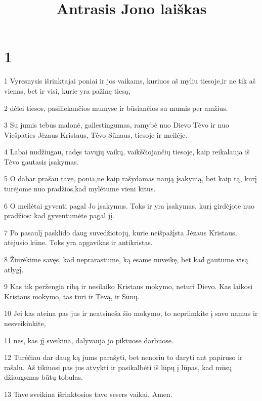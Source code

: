 

\title{Antrasis Jono laiškas}

\chapter{1}


\par 1 Vyresnysis išrinktajai poniai ir jos vaikams, kuriuos aš myliu tiesoje,­ir ne tik aš vienas, bet ir visi, kurie yra pažinę tiesą,­ 
\par 2 dėlei tiesos, pasiliekančios mumyse ir būsiančios su mumis per amžius. 
\par 3 Su jumis tebus malonė, gailestingumas, ramybė nuo Dievo Tėvo ir nuo Viešpaties Jėzaus Kristaus, Tėvo Sūnaus, tiesoje ir meilėje. 
\par 4 Labai nudžiugau, radęs tavųjų vaikų, vaikščiojančių tiesoje, kaip reikalauja iš Tėvo gautasis įsakymas. 
\par 5 O dabar prašau tave, ponia,­ne kaip rašydamas naują įsakymą, bet kaip tą, kurį turėjome nuo pradžios,­kad mylėtume vieni kitus. 
\par 6 O meilė­tai gyventi pagal Jo įsakymus. Toks ir yra įsakymas, kurį girdėjote nuo pradžios: kad gyventumėte pagal jį. 
\par 7 Po pasaulį pasklido daug suvedžiotojų, kurie neišpažįsta Jėzaus Kristaus, atėjusio kūne. Toks yra apgavikas ir antikristas. 
\par 8 Žiūrėkime savęs, kad neprarastume, ką esame nuveikę, bet kad gautume visą atlygį. 
\par 9 Kas tik peržengia ribą ir nesilaiko Kristaus mokymo, neturi Dievo. Kas laikosi Kristaus mokymo, tas turi ir Tėvą, ir Sūnų. 
\par 10 Jei kas ateina pas jus ir neatsineša šio mokymo, to nepriimkite į savo namus ir nesveikinkite, 
\par 11 nes, kas jį sveikina, dalyvauja jo piktuose darbuose. 
\par 12 Turėčiau dar daug ką jums parašyti, bet nenoriu to daryti ant papiruso ir rašalu. Aš tikiuosi pas jus atvykti ir pasikalbėti iš lūpų į lūpas, kad mūsų džiaugsmas būtų tobulas. 
\par 13 Tave sveikina išrinktosios tavo sesers vaikai. Amen.


